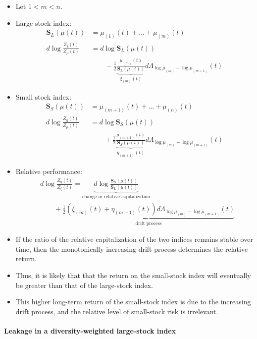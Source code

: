 \documentclass[a4paper,landscape,8pt,fleqn]{scrartcl}
\begin{document}
\begin{multicols*}{3}
\begin{itemize}
\item Let $1<m<n$.
\item Large stock index:
\begin{align*}
\pmb{S}_L(\mu(t)) &= \mu_{(1)}(t) + \ldots + \mu_{(m)}(t) \\
d\log \frac{Z_\xi(t)}{Z_\mu(t)} &= d \log \pmb{S}_L(\mu(t)) \\
& \qquad - \frac{1}{2} \underbrace{\frac{\mu_{(m)}(t)}{\pmb{S}_L(\mu(t))}}\limits_{\xi_{(m)}(t)} d\Lambda_{\log \mu_{(m)} - \log \mu_{(m+1)}}(t)
\end{align*}
\item Small stock index:
\begin{align*}
\pmb{S}_S(\mu(t)) &= \mu_{(m+1)}(t) + \ldots + \mu_{(n)}(t) \\
d\log \frac{Z_\eta(t)}{Z_\mu(t)} &= d \log \pmb{S}_S(\mu(t)) \\
& \qquad + \frac{1}{2} \underbrace{\frac{\mu_{(m+1)}(t)}{\pmb{S}_S(\mu(t))}}\limits_{\eta_{(m+1)}(t)} d\Lambda_{\log \mu_{(m)} - \log \mu_{(m+1)}}(t)
\end{align*}
\item Relative performance:
\begin{align*}
& d\log \frac{Z_\eta(t)}{Z_\xi(t)} = \underbrace{d\log \frac{\pmb{S}_S(\mu(t))}{\pmb{S}_L(\mu(t))}}\limits_\text{change in relative capitalization} \\
& \qquad + \underbrace{\frac{1}{2} \left( \xi_{(m)}(t) + \eta_{(m+1)}(t) \right) d\Lambda_{\log \mu_{(m)} - \log \mu_{(m+1)}}(t)}\limits_\text{drift process}
\end{align*}
\item If the ratio of the relative capitalization of the two indices remains stable over time, then the monotonically increasing drift process determines the relative return.
\item Thus, it is likely that that the return on the small-stock index will eventually be greater than that of the large-stock index.
\item This higher long-term return of the small-stock index is due to the increasing drift process, and the relative level of small-stock risk is irrelevant.
\end{itemize}

\paragraph{Leakage in a diversity-weighted large-stock index}


\end{multicols*}
\end{document}
